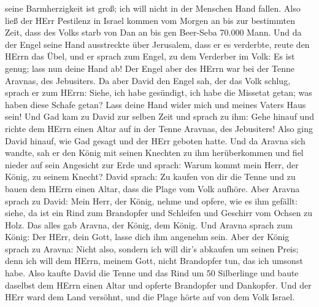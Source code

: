 seine Barmherzigkeit ist groß; ich will nicht in der Menschen Hand
fallen.  Also ließ der HErr Pestilenz in Israel kommen vom
Morgen an bis zur bestimmten Zeit, dass des Volks starb von Dan an bis
gen Beer-Seba 70.000 Mann.  Und da der Engel seine Hand
ausstreckte über Jerusalem, dass er es verderbte, reute den HErrn das
Übel, und er sprach zum Engel, zu dem Verderber im Volk: Es ist genug;
lass nun deine Hand ab! Der Engel aber des HErrn war bei der Tenne
Aravnas, des Jebusiters.  Da aber David den Engel sah, der
das Volk schlug, sprach er zum HErrn: Siehe, ich habe gesündigt, ich
habe die Missetat getan; was haben diese Schafe getan? Lass deine Hand
wider mich und meines Vaters Haus sein!  Und Gad kam zu
David zur selben Zeit und sprach zu ihm: Gehe hinauf und richte dem
HErrn einen Altar auf in der Tenne Aravnas, des Jebusiters!
 Also ging David hinauf, wie Gad gesagt und der HErr
geboten hatte.  Und da Aravna sich wandte, sah er den König
mit seinen Knechten zu ihm herüberkommen und fiel nieder auf sein
Angesicht zur Erde  und sprach: Warum kommt mein Herr, der
König, zu seinem Knecht? David sprach: Zu kaufen von dir die Tenne und
zu bauen dem HErrn einen Altar, dass die Plage vom Volk aufhöre.
 Aber Aravna sprach zu David: Mein Herr, der König, nehme
und opfere, wie es ihm gefällt: siehe, da ist ein Rind zum Brandopfer
und Schleifen und Geschirr vom Ochsen zu Holz.  Das alles
gab Aravna, der König, dem König. Und Aravna sprach zum König: Der HErr,
dein Gott, lasse dich ihm angenehm sein.  Aber der König
sprach zu Aravna: Nicht also, sondern ich will dir's abkaufen um seinen
Preis; denn ich will dem HErrn, meinem Gott, nicht Brandopfer tun, das
ich umsonst habe. Also kaufte David die Tenne und das Rind um 50
Silberlinge  und baute daselbst dem HErrn einen Altar und
opferte Brandopfer und Dankopfer. Und der HErr ward dem Land versöhnt,
und die Plage hörte auf von dem Volk Israel.
